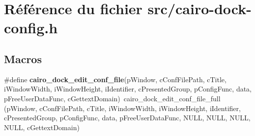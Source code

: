 \section{Référence du fichier src/cairo-dock-config.h}
\label{cairo-dock-config_8h}
\subsection*{Macros}
\begin{CompactItemize}
\item 
\#define {\bf cairo\_\-dock\_\-edit\_\-conf\_\-file}(pWindow, cConfFilePath, cTitle, iWindowWidth, iWindowHeight, iIdentifier, cPresentedGroup, pConfigFunc, data, pFreeUserDataFunc, cGettextDomain)~cairo\_\-dock\_\-edit\_\-conf\_\-file\_\-full (pWindow, cConfFilePath, cTitle, iWindowWidth, iWindowHeight, iIdentifier, cPresentedGroup, pConfigFunc, data, pFreeUserDataFunc, NULL, NULL, NULL, NULL, cGettextDomain)
\end{CompactItemize}

